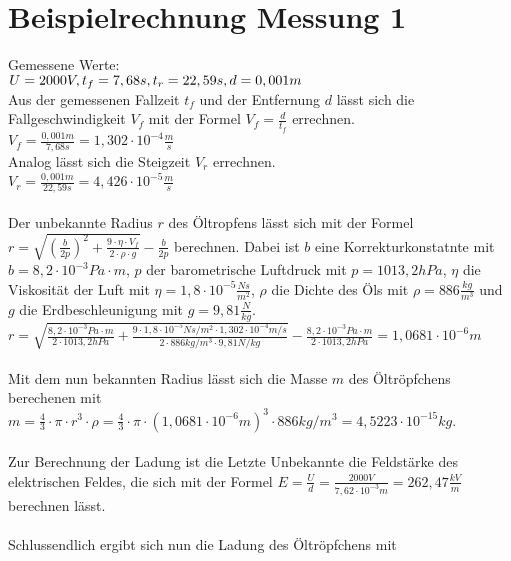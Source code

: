 \section*{Beispielrechnung Messung 1}
Gemessene Werte: \\
$U = 2000V,		\\
t_f = 7,68s,	\\
t_r = 22,59s,	\\
d = 0,001m 		\\ $
\\
Aus der gemessenen Fallzeit $t_f$ und der Entfernung $d$ lässt sich die Fallgeschwindigkeit $V_f$ mit der Formel $V_f = \frac{d}{t_f}$ errechnen. \\
$V_f = \frac{0,001m}{7,68s} = 1,302 \cdot 10^{-4} \frac{m}{s}$	\\
Analog lässt sich die Steigzeit $V_r$ errechnen. \\
$V_r = \frac{0,001m}{22,59s} = 4,426 \cdot 10^{-5} \frac{m}{s}$ \\
\\ Der unbekannte Radius $r$ des Öltropfens lässt sich mit der Formel $r=\sqrt{(\frac{b}{2p})^{2} + \frac{9 \cdot \eta \cdot V_f}{2\cdot \rho \cdot g}} - \frac{b}{2p}$ berechnen. Dabei ist $b$ eine Korrekturkonstatnte mit $b=8,2 \cdot 10^{-3} Pa \cdot m$, $p$ der barometrische Luftdruck mit $p = 1013,2 hPa$, $\eta$ die Viskosität der Luft mit $\eta = 1,8 \cdot 10^{-5} \frac{Ns}{m^2}$, $\rho$ die Dichte des Öls mit $\rho = 886 \frac{kg}{m^3}$ und $g$ die Erdbeschleunigung mit $g = 9,81\frac{N}{kg}$.
\\
$r=\sqrt{\frac{8,2\cdot10^{-3}Pa\cdot m}{2\cdot 1013,2 hPa}+\frac{9\cdot 1,8\cdot 10^{-5}Ns/m^2 \cdot 1,302 \cdot 10^{-4} m/s}{2\cdot 886kg/m^3 \cdot 9,81N/kg}}-\frac{8,2\cdot 10^{-3}Pa\cdot m}{2\cdot 1013,2 hPa} = 1,0681\cdot 10^{-6}m$
\\ \\
Mit dem nun bekannten Radius lässt sich die Masse $m$ des Öltröpfchens berechenen mit $m=\frac{4}{3}\cdot \pi \cdot r^3 \cdot \rho = \frac{4}{3} \cdot \pi \cdot (1,0681\cdot 10^{-6}m)^3 \cdot 886kg/m^3 = 4,5223\cdot 10^{-15}kg$.
\\ \\
Zur Berechnung der Ladung ist die Letzte Unbekannte die Feldstärke des elektrischen Feldes, die sich mit der Formel $E=\frac{U}{d} = \frac{2000V}{7,62\cdot 10^{-3}m} = 262,47\frac{kV}{m}$ berechnen lässt.
\\ \\
Schlussendlich ergibt sich nun die Ladung des Öltröpfchens mit \\
